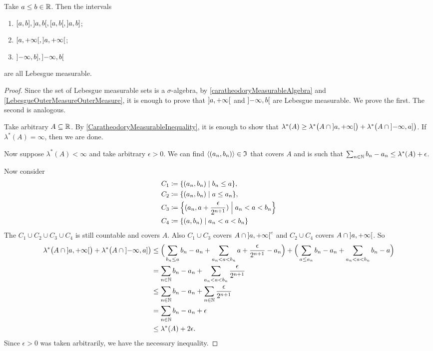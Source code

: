 \begin{lemma} \label{intervalsLebesgueMeasurable}
Take $a\leq b\in \mathbb{R}$. Then the intervals
\begin{enumerate}
\item $\interval[c]{a,b}, \interval[o]{a,b}, \interval[co]{a,b}, \interval[oc]{a,b}$;
\item $\interval[co]{a,+\infty}, \interval[o]{a,+\infty}$;
\item $\interval[oc]{-\infty,b}, \interval[o]{-\infty,b}$
\end{enumerate}
are all Lebesgue measurable.
\end{lemma}
\begin{proof}
Since the set of Lebesgue measurable sets is a $\sigma$-algebra, by \ref{caratheodoryMeasurableAlgebra} and \ref{LebesgueOuterMeasureOuterMeasure}, it is enough to prove that $\interval[o]{a,+\infty}$ and $\interval[o]{-\infty,b}$ are Lebesgue measurable. We prove the first. The second is analogous.

Take arbitrary $A\subseteq \mathbb{R}$. By \ref{CaratheodoryMeasurableInequality}, it is enough to show that $\lambda^*(A) \geq \lambda^*\big(A \cap \interval[o]{a,+\infty}\big) + \lambda^*\big(A \cap \interval[oc]{-\infty, a}\big)$. If $\lambda^*(A) = \infty$, then we are done.

Now suppose $\lambda^*(A) < \infty$ and take arbitrary $\epsilon > 0$. We can find $\left\langle (a_n,b_n) \right\rangle\in\mathfrak{I}$ that covers $A$ and is such that $\sum_{n\in\mathbb{N}}b_n-a_n \leq \lambda^*(A)+ \epsilon$.

Now consider
\begin{align*}
C_1 &\defeq \setbuilder{(a_n, b_n)}{b_n \leq a}, \\
C_2 &\defeq \setbuilder{(a_n, b_n)}{a \leq a_n}, \\
C_3 &\defeq \setbuilder{(a_n, a+ \frac{\epsilon}{2^{n+1}})}{a_n < a < b_n} \\
C_4 &\defeq \setbuilder{(a, b_n)}{a_n < a < b_n}
\end{align*}
The $C_1\cup C_2\cup C_3\cup C_4$ is still countable and covers $A$. Also $C_1\cup C_3$ covers $A \cap \interval[o]{a,+\infty}^c$ and $C_2\cup C_4$ covers $A\cap \interval[o]{a,+\infty}$. So
\begin{align*}
\lambda^*\big(A \cap \interval[o]{a,+\infty}\big) + \lambda^*\big(A \cap \interval[oc]{-\infty, a}\big) &\leq \Big(\sum_{b_n\leq a}b_n - a_n + \sum_{a_n < a < b_n} a+ \frac{\epsilon}{2^{n+1}} - a_n\Big) + \Big(\sum_{a\leq a_n}b_n-a_n + \sum_{a_n < a < b_n}b_n - a\Big) \\
&= \sum_{n\in \N}b_n - a_n + \sum_{a_n < a < b_n} \frac{\epsilon}{2^{n+1}} \\
&\leq \sum_{n\in \N}b_n - a_n + \sum_{n\in \N} \frac{\epsilon}{2^{n+1}} \\
&= \sum_{n\in \N}b_n - a_n + \epsilon \\
&\leq \lambda^*(A) +2\epsilon.
\end{align*}
Since $\epsilon>0$ was taken arbitrarily, we have the necessary inequality.
\end{proof}

